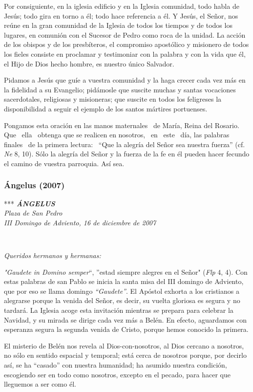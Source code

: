 Por consiguiente, en la iglesia edificio y en la Iglesia comunidad, todo
habla de Jesús; todo gira en torno a él; todo hace referencia a él. Y
Jesús, el Señor, nos reúne en la gran comunidad de la Iglesia de todos
los tiempos y de todos los lugares, en comunión con el Sucesor de Pedro
como roca de la unidad. La acción de los obispos y de los presbíteros,
el compromiso apostólico y misionero de todos los fieles consiste en
proclamar y testimoniar con la palabra y con la vida que él, el Hijo de
Dios hecho hombre, es nuestro único Salvador.

Pidamos a Jesús que guíe a vuestra comunidad y la haga crecer cada vez
más en la fidelidad a su Evangelio; pidámosle que suscite muchas y
santas vocaciones sacerdotales, religiosas y misioneras; que suscite en
todos los feligreses la disponibilidad a seguir el ejemplo de los santos
mártires portuenses.

Pongamos esta oración en las manos maternales ~de María, Reina del
Rosario. Que ~ella ~obtenga que se realicen en nosotros, ~en ~este ~día,
las palabras finales ~de la primera lectura:~ ``Que la alegría del Señor
sea nuestra fuerza'' (cf. \emph{Ne} 8, 10). Sólo la alegría del Señor y
la fuerza de la fe en él pueden hacer fecundo el camino de vuestra
parroquia. Así sea.

\subsubsection{Ángelus (2007)}
***
\emph{\textbf{ÁNGELUS}\\[2\baselineskip]Plaza de San Pedro\\
	III Domingo de Adviento, 16 de diciembre de 2007}

~

\emph{Queridos hermanos y hermanas:}~

\emph{"Gaudete in Domino semper}``, ''estad siempre alegres en el Señor"
(\emph{Flp} 4, 4). Con estas palabras de san Pablo se inicia la santa
misa del III domingo de Adviento, que por eso se llama domingo
\emph{``Gaudete''}. El Apóstol exhorta a los cristianos a alegrarse
porque la venida del Señor, es decir, su vuelta gloriosa es segura y no
tardará. La Iglesia acoge esta invitación mientras se prepara para
celebrar la Navidad, y su mirada se dirige cada vez más a Belén. En
efecto, aguardamos con esperanza segura la segunda venida de Cristo,
porque hemos conocido la primera.

El misterio de Belén nos revela al Dios-con-nosotros, al Dios cercano a
nosotros, no sólo en sentido espacial y temporal; está cerca de nosotros
porque, por decirlo así, se ha ``casado'' con nuestra humanidad; ha
asumido nuestra condición, escogiendo ser en todo como nosotros, excepto
en el pecado, para hacer que lleguemos a ser como él.

